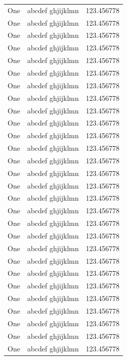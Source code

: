 \documentclass[zihao = -4, linespread = 1.5]{ctexart} %
\begin{document}
\begin{center}
\begin{longtable}{|l|l|l|}
One & abcdef ghjijklmn & 123.456778 \\
One & abcdef ghjijklmn & 123.456778 \\
One & abcdef ghjijklmn & 123.456778 \\
One & abcdef ghjijklmn & 123.456778 \\
One & abcdef ghjijklmn & 123.456778 \\
One & abcdef ghjijklmn & 123.456778 \\
One & abcdef ghjijklmn & 123.456778 \\
One & abcdef ghjijklmn & 123.456778 \\
One & abcdef ghjijklmn & 123.456778 \\
One & abcdef ghjijklmn & 123.456778 \\
One & abcdef ghjijklmn & 123.456778 \\
One & abcdef ghjijklmn & 123.456778 \\
One & abcdef ghjijklmn & 123.456778 \\
One & abcdef ghjijklmn & 123.456778 \\
One & abcdef ghjijklmn & 123.456778 \\
One & abcdef ghjijklmn & 123.456778 \\
One & abcdef ghjijklmn & 123.456778 \\
One & abcdef ghjijklmn & 123.456778 \\
One & abcdef ghjijklmn & 123.456778 \\
One & abcdef ghjijklmn & 123.456778 \\
One & abcdef ghjijklmn & 123.456778 \\
One & abcdef ghjijklmn & 123.456778 \\
One & abcdef ghjijklmn & 123.456778 \\
One & abcdef ghjijklmn & 123.456778 \\
One & abcdef ghjijklmn & 123.456778 \\
One & abcdef ghjijklmn & 123.456778 \\
One & abcdef ghjijklmn & 123.456778 \\
One & abcdef ghjijklmn & 123.456778 \\
\end{longtable}
\end{center}
\end{document}
